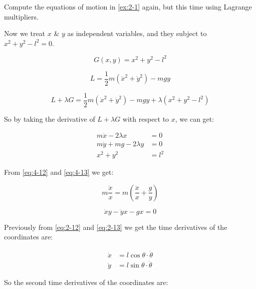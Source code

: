 \begin{example}
    Compute the equations of motion in \ref{ex:2-1} again, but this time using Lagrange
    multipliers.
\end{example}

Now we treat $x$ \& $y$ as independent variables, and they subject to $x^2+y^2-l^2=0$.
    
\begin{equation}
    G\left(x, y\right) = x^2 + y^2 - l^2
\end{equation}

\begin{equation}
    L = \frac{1}{2} m \left(\dot{x} ^ 2 + \dot{y} ^ 2\right) - mgy
\end{equation}

\begin{equation}
    L + \lambda G = \frac{1}{2} m \left(\dot{x} ^ 2 + \dot{y} ^ 2\right) - mgy + \lambda \left(x^2 + y^2 - l^2\right)
\end{equation}

So by taking the derivative of $L + \lambda G$ with respect to $x$, we can get:

\begin{align}
    \label{eq:4-12}
    m \ddot{x} - 2 \lambda x &= 0 \\
    \label{eq:4-13}
    m \ddot{y} + mg - 2 \lambda y &= 0 \\
    x ^ 2 + y ^ 2 &= l ^ 2
\end{align}

From \ref{eq:4-12} and \ref{eq:4-13} we get:

\begin{equation}
    m \frac{\ddot{x}}{x} = m \left(\frac{\ddot{x}}{x} + \frac{g}{y}\right)
\end{equation}

\begin{equation}
    \label{eq:4-16}
    \ddot{x} y - \ddot{y} x - gx = 0
\end{equation}

Previously from \ref{eq:2-12} and \ref{eq:2-13} we get the time derivatives of the 
coordinates are:

\begin{align}
    \dot{x} &= l \cos{\theta} \cdot \dot{\theta} \\
    \dot{y} &= l \sin{\theta} \cdot \dot{\theta} 
\end{align}

So the second time derivatives of the coordinates are:

